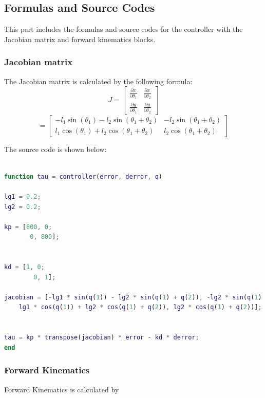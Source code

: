 \documentclass{article}
\begin{document}
\subsection{Formulas and Source Codes}
This part includes the formulas and source codes for the controller with the Jacobian matrix and forward kinematics blocks.
\subsubsection*{Jacobian matrix}
The Jacobian matrix is calculated by the following formula:\\
\[
J = \begin{bmatrix}
    \frac{\partial x}{\partial \theta_1} & \frac{\partial x}{\partial \theta_2} \\
    \frac{\partial y}{\partial \theta_1} & \frac{\partial y}{\partial \theta_2}
\end{bmatrix}
\]
\[
= \begin{bmatrix}
    -l_1 \sin(\theta_1) - l_2 \sin(\theta_1 + \theta_2) & -l_2 \sin(\theta_1 + \theta_2) \\
    l_1 \cos(\theta_1) + l_2 \cos(\theta_1 + \theta_2) & l_2 \cos(\theta_1 + \theta_2)
\end{bmatrix}
\]

    

The source code is shown below:
\begin{lstlisting}[language=Matlab, basicstyle=\small\ttfamily]

function tau = controller(error, derror, q)

lg1 = 0.2;
lg2 = 0.2;

kp = [800, 0;
       0, 800];


kd = [1, 0;
        0, 1];

jacobian = [-lg1 * sin(q(1)) - lg2 * sin(q(1) + q(2)), -lg2 * sin(q(1) + q(2));
    lg1 * cos(q(1)) + lg2 * cos(q(1) + q(2)), lg2 * cos(q(1) + q(2))];


tau = kp * transpose(jacobian) * error - kd * derror;
end

\end{lstlisting}

\subsubsection*{Forward Kinematics}

Forward Kinematics is calculated by\\
\end{document}
